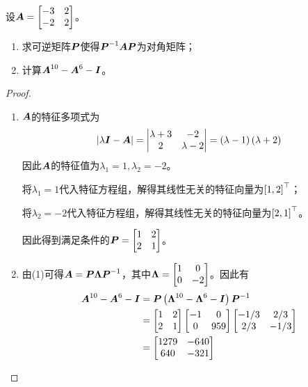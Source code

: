 \begin{problem}
设\(\boldsymbol{A}=\begin{bmatrix}-3&2\\-2&2\end{bmatrix}\)。
\begin{enumerate}
    \item 求可逆矩阵\(\boldsymbol{P}\)使得\({\boldsymbol{P}}^{-1}\boldsymbol{A}\boldsymbol{P}\)为对角矩阵；
    \item 计算\(\boldsymbol{A}^{10}-\boldsymbol{A}^6-\boldsymbol{I}\)。
\end{enumerate}
\end{problem}
\begin{proof}
    \begin{enumerate}
        \item {
              \(\boldsymbol{A}\)的特征多项式为
              \begin{equation*}
                  \left|\lambda\boldsymbol{I}-\boldsymbol{A} \right|=\begin{vmatrix}\lambda+3&-2\\2&\lambda-2\end{vmatrix}=\left( \lambda-1 \right)\left( \lambda+2 \right)
              \end{equation*}
              因此\(\boldsymbol{A}\)的特征值为\(\lambda_1=1,\lambda_2=-2\)。

              将\(\lambda_1=1\)代入特征方程组，解得其线性无关的特征向量为\(\left[ 1,2 \right]^\top\)；

              将\(\lambda_2=-2\)代入特征方程组，解得其线性无关的特征向量为\(\left[ 2,1 \right]^\top\)。

              因此得到满足条件的\(\boldsymbol{P}=\begin{bmatrix}1&2\\2&1\end{bmatrix}\)。
              }
        \item {
              由(1)可得\(\boldsymbol{A}=\boldsymbol{P}\boldsymbol{\Lambda}{\boldsymbol{P}}^{-1}\)，其中\(\boldsymbol{\Lambda}=\begin{bmatrix}1&0\\0&-2\end{bmatrix}\)。因此有
              \begin{align*}
                  \boldsymbol{A}^{10}-\boldsymbol{A}^6-\boldsymbol{I} & =\boldsymbol{P}\left( \boldsymbol{\Lambda}^{10}-\boldsymbol{\Lambda}^6-\boldsymbol{I} \right){\boldsymbol{P}}^{-1}                                                                      \\
                                           & =\begin{bmatrix}1&2\\2&1\end{bmatrix}\begin{bmatrix}-1&0\\0&959\end{bmatrix}\begin{bmatrix}-1/3&2/3\\2/3&-1/3\end{bmatrix} \\
                                           & =\begin{bmatrix}1279&-640\\640&-321\end{bmatrix}
              \end{align*}
              }
    \end{enumerate}
\end{proof}

